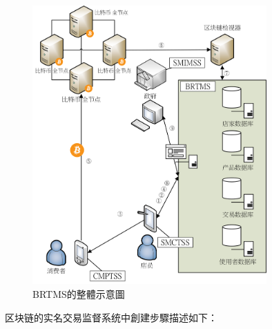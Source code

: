 	\begin{figure}[h]
		\centering
		\includegraphics[width = 0.8\textwidth]{fig4.png}
		\caption{BRTMS的整體示意圖}\label{fig4}
	\end{figure}

	区块链的实名交易监督系统中創建步驟描述如下：

